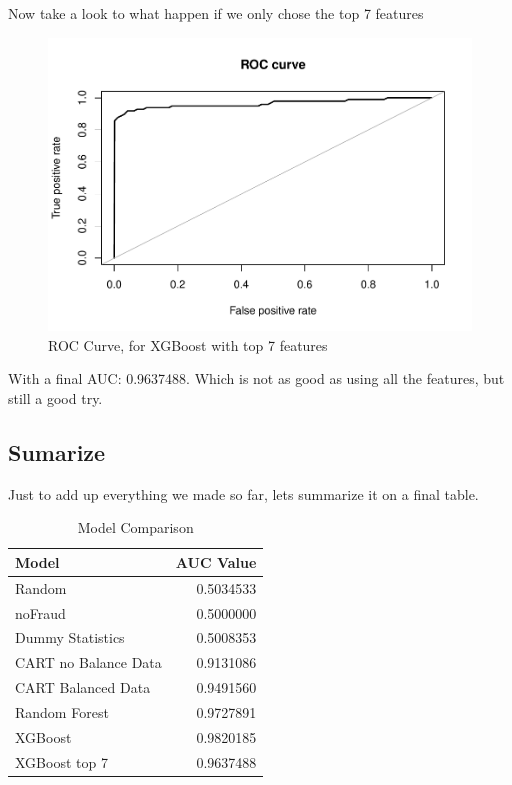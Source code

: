 \documentclass[
]{article}
\begin{document}
Now take a look to what happen if we only chose the top 7 features

\begin{figure}[H]

{\centering \includegraphics[width=0.7\linewidth]{fraudDetectionReport_files/figure-latex/xgboost_top7-1} 

}

\caption{ROC Curve, for XGBoost with top 7 features}\label{fig:xgboost_top7}
\end{figure}

With a final AUC: 0.9637488. Which is not as good as using all the
features, but still a good try.

\hypertarget{sumarize}{%
\subsection{Sumarize}\label{sumarize}}

Just to add up everything we made so far, lets summarize it on a final
table.

\begin{table}[!h]

\caption{\label{tab:compare_models()}Model Comparison}
\centering
\fontsize{10}{12}\selectfont
\begin{tabular}[t]{lr}
\toprule
Model & AUC Value\\
\midrule
Random & 0.5034533\\
noFraud & 0.5000000\\
Dummy Statistics & 0.5008353\\
CART no Balance Data & 0.9131086\\
CART Balanced Data & 0.9491560\\
Random Forest & 0.9727891\\
XGBoost & 0.9820185\\
XGBoost top 7 & 0.9637488\\
\bottomrule
\end{tabular}
\end{table}
\newpage
\end{document}
